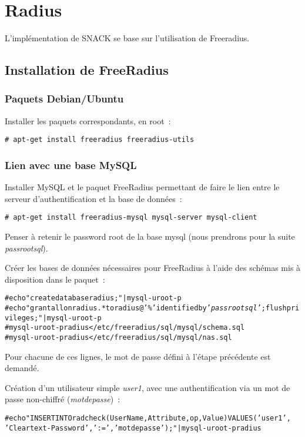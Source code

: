 \section{Radius}
L'implémentation de SNACK se base sur l'utilisation de Freeradius.
\subsection{Installation de FreeRadius}
\subsubsection{Paquets Debian/Ubuntu}

Installer les paquets correspondants, en root~:
\begin{verbatim}
# apt-get install freeradius freeradius-utils
\end{verbatim}

\subsubsection{Lien avec une base MySQL}

Installer MySQL et le paquet FreeRadius permettant de faire le lien entre le serveur d'authentification et la base de données~:
\begin{verbatim}
# apt-get install freeradius-mysql mysql-server mysql-client
\end{verbatim}

Penser à retenir le password root de la base mysql (nous prendrons pour la suite \emph{passrootsql}).

Créer les bases de données nécessaires pour FreeRadius à l'aide des schémas mis à disposition dans le paquet~:
\begin{alltt}
# echo "create database radius;" | mysql -u root -p
# echo "grant all on radius.* to radius@'\%' identified by '\emph{passrootsql}'; flush privileges;" | mysql -u root -p
# mysql -uroot -p radius < /etc/freeradius/sql/mysql/schema.sql
# mysql -uroot -p radius < /etc/freeradius/sql/mysql/nas.sql
\end{alltt}
Pour chacune de ces lignes, le mot de passe défini à l'étape précédente est demandé.

Création d'un utilisateur simple \emph{user1}, avec une authentification via un mot de passe non-chiffré (\emph{motdepasse})~:
\begin{alltt}
# echo "INSERT INTO radcheck(UserName,Attribute,op,Value) VALUES ('user1',\\'Cleartext-Password',':=','motdepasse');" | mysql -u root -p radius
\end{alltt}

